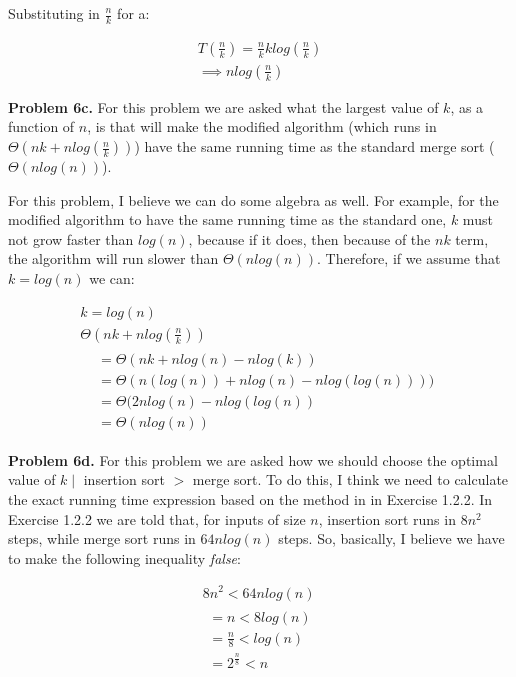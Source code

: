 \documentclass{article}
\begin{document}
Substituting in $\frac{n}{k}$ for a:

\begin{gather}
    T(\frac{n}{k}) = \frac{n}{k}klog(\frac{n}{k}) \\
    \implies nlog(\frac{n}{k})
\end{gather}

\hfill

\textbf{Problem 6c.} For this problem we are asked what the largest value of $k$, as a function of $n$, is that will make the modified algorithm (which runs in $\Theta(nk + nlog(\frac{n}{k}))$) have the same running time as the standard merge sort ($\Theta(nlog(n))$).

For this problem, I believe we can do some algebra as well. For example, for the modified algorithm to have the same running time as the standard one, $k$ must not grow faster than $log(n)$, because if it does, then because of the $nk$ term, the algorithm will run slower than $\Theta(nlog(n))$. Therefore, if we assume that $k = log(n)$ we can:

\begin{gather}
    k = log(n) \\
    \Theta(nk + nlog(\frac{n}{k})) \\
    \begin{split}
        &= \Theta(nk + nlog(n) - nlog(k)) \\
        &= \Theta(n(log(n)) + nlog(n) - nlog(log(n)))) \\
        &= \Theta(2nlog(n) - nlog(log(n)) \\
        &= \Theta(nlog(n))
    \end{split}
\end{gather}

\hfill

\textbf{Problem 6d.} For this problem we are asked how we should choose the optimal value of $k \mid$ insertion sort $>$ merge sort. To do this, I think we need to calculate the exact running time expression based on the method in \cite{CLRS} in Exercise 1.2.2. In Exercise 1.2.2 we are told that, for inputs of size $n$, insertion sort runs in $8n^2$ steps, while merge sort runs in $64nlog(n)$ steps. So, basically, I believe we have to make the following inequality \emph{false}:

\begin{gather}
    8n^2 < 64nlog(n) \\
    \begin{align}
        = n < 8log(n) \\
        = \frac{n}{8} < log(n) \\
        = 2^{\frac{n}{8}} < n
    \end{align}
\end{gather}
\end{document}
